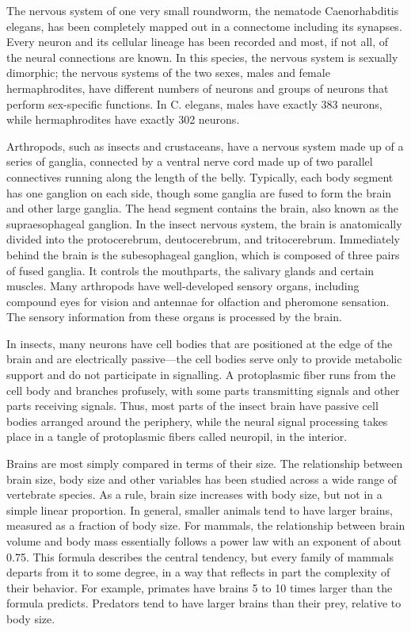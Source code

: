 The nervous system of one very small roundworm, the nematode Caenorhabditis elegans, has been completely mapped out in a connectome including its synapses. Every neuron and its cellular lineage has been recorded and most, if not all, of the neural connections are known. In this species, the nervous system is sexually dimorphic; the nervous systems of the two sexes, males and female hermaphrodites, have different numbers of neurons and groups of neurons that perform sex-specific functions. In C. elegans, males have exactly 383 neurons, while hermaphrodites have exactly 302 neurons.

Arthropods, such as insects and crustaceans, have a nervous system made up of a series of ganglia, connected by a ventral nerve cord made up of two parallel connectives running along the length of the belly. Typically, each body segment has one ganglion on each side, though some ganglia are fused to form the brain and other large ganglia. The head segment contains the brain, also known as the supraesophageal ganglion. In the insect nervous system, the brain is anatomically divided into the protocerebrum, deutocerebrum, and tritocerebrum. Immediately behind the brain is the subesophageal ganglion, which is composed of three pairs of fused ganglia. It controls the mouthparts, the salivary glands and certain muscles. Many arthropods have well-developed sensory organs, including compound eyes for vision and antennae for olfaction and pheromone sensation. The sensory information from these organs is processed by the brain.

In insects, many neurons have cell bodies that are positioned at the edge of the brain and are electrically passive---the cell bodies serve only to provide metabolic support and do not participate in signalling. A protoplasmic fiber runs from the cell body and branches profusely, with some parts transmitting signals and other parts receiving signals. Thus, most parts of the insect brain have passive cell bodies arranged around the periphery, while the neural signal processing takes place in a tangle of protoplasmic fibers called neuropil, in the interior.

Brains are most simply compared in terms of their size. The relationship between brain size, body size and other variables has been studied across a wide range of vertebrate species. As a rule, brain size increases with body size, but not in a simple linear proportion. In general, smaller animals tend to have larger brains, measured as a fraction of body size. For mammals, the relationship between brain volume and body mass essentially follows a power law with an exponent of about 0.75. This formula describes the central tendency, but every family of mammals departs from it to some degree, in a way that reflects in part the complexity of their behavior. For example, primates have brains 5 to 10 times larger than the formula predicts. Predators tend to have larger brains than their prey, relative to body size.

